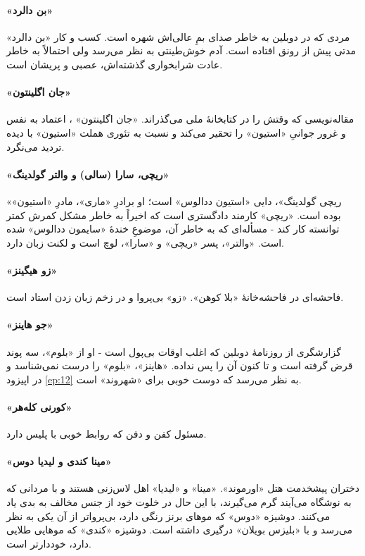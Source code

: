 \documentclass[12pt]{book}
\newcommand{\noun}[1]{«{#1}»}
\begin{document}
    \paragraph{\noun{بن دالرد}\protect{}}
    مردی که در دوبلین به خاطر صدای بمِ عالی‌اش شهره است. کسب و کار \noun{بن دالرد}  مدتی پیش از رونق افتاده است. آدم خوش‌طینتی به نظر می‌رسد ولی احتمالاً به خاطر عادت شرابخواری گذشته‌اش، عصبی و پریشان است.
    \paragraph{\noun{جان اگلینتون}\protect{}}
    مقاله‌نویسی که وقتش را در کتابخانۀ ملی می‌گذراند. \noun{جان اگلینتون} ، اعتماد به نفس و غرور جوانیِ \noun{استیون} را تحقیر می‌کند و نسبت به تئوری هملت \noun{استیون} با دیده تردید می‌نگرد.
    \paragraph{\noun{ریچی، سارا (سالی) و والتر گولدینگ}\protect{}}
    \noun{ریچی گولدینگ}، دایی \noun{استیون ددالوس} است؛ او برادرِ \noun{ماری}، مادرِ \noun{استیون} بوده است. \noun{ریچی} کارمند دادگستری است که اخیراً به خاطر مشکل کمرش کمتر توانسته کار کند - مسأله‌ای که به خاطر آن، موضوعِ خندۀ \noun{سایمون  ددالوس} شده است. \noun{والتر}، پسر \noun{ریچی} و \noun{سارا}، لوچ است و لکنت زبان دارد.
    \paragraph{\noun{زو هیگینز}\protect{}}
    فاحشه‌ای در فاحشه‌خانۀ \noun{بلا کوهن}. \noun{زو} بی‌پروا و در زخم زبان زدن استاد است.
    \paragraph{\noun{جو هاینز}\protect{}}
    گزارشگری از روزنامۀ دوبلین که اغلب اوقات بی‌پول است - او از \noun{بلوم}، سه پوند قرض گرفته است و تا کنون آن را پس نداده. \noun{هاینز}، \noun{بلوم} را درست نمی‌شناسد و در اپیزود \ref{ep:12} به نظر می‌رسد که دوست خوبی برای \noun{شهروند‬} است.
    \paragraph{\noun{کورنی کله‌هر}\protect{}}
    مسئول کفن و دفن که روابط خوبی با پلیس دارد.
    \paragraph{\noun{مینا کندی و لیدیا دوس}\protect{}}
    دختران پیشخدمت هتل \noun{اورموند}. \noun{مینا} و \noun{لیدیا} اهل لاس‌زنی هستند و با مردانی که به نوشگاه می‌آیند گرم می‌گیرند، با این حال در خلوت خود از جنس مخالف به بدی یاد می‌کنند. دوشیزه \noun{دوس} که موهای برنز رنگی دارد، بی‌پرواتر از آن یکی به نظر می‌رسد و با \noun{بلیزس بویلان‬} درگیری داشته است. دوشیزه \noun{کندی} که موهایی طلایی دارد، خوددارتر است.
\end{document}
